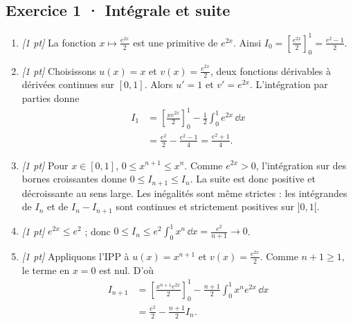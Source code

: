 \subsection*{Exercice 1 · Intégrale et suite}\begin{enumerate}

\item \textit{[1 pt]} La fonction $x\mapsto \frac{e^{2x}}{2}$ est une primitive de $e^{2x}$. Ainsi $I_0=[\frac{e^{2x}}{2}]_0^1=\frac{e^{2}-1}{2}$.

\item \textit{[1 pt]} Choisissons $u(x)=x$ et $v(x)=\frac{e^{2x}}{2}$, deux fonctions dérivables à dérivées continues sur $[0,1]$. Alors $u'=1$ et $v'=e^{2x}$. L'intégration par parties donne
\[\begin{aligned}I_1&=\left[\frac{xe^{2x}}{2}\right]_0^1-\frac{1}{2}\int_0^1e^{2x}\,\dd x\\&=\frac{e^{2}}{2}-\frac{e^{2}-1}{4}=\frac{e^{2}+1}{4}.\end{aligned}\]

\item \textit{[1 pt]} Pour $x\in[0,1]$, $0\le x^{n+1}\le x^n$. Comme $e^{2x}>0$, l'intégration sur des bornes croissantes donne $0\le I_{n+1}\le I_n$. La suite est donc positive et décroissante au sens large. Les inégalités sont même strictes : les intégrandes de $I_n$ et de $I_n-I_{n+1}$ sont continues et strictement positives sur $]0,1[$.

\item \textit{[1 pt]} $e^{2x}\le e^{2}$ ; donc $0\le I_n\le e^{2}\int_0^1x^n\,\dd x=\frac{e^{2}}{n+1}\to0$.

\item \textit{[1 pt]} Appliquons l'IPP à $u(x)=x^{n+1}$ et $v(x)=\frac{e^{2x}}{2}$. Comme $n+1\ge1$, le terme en $x=0$ est nul. D'où
\[\begin{aligned}I_{n+1}&=\left[\frac{x^{n+1}e^{2x}}{2}\right]_0^1-\frac{n+1}{2}\int_0^1x^ne^{2x}\,\dd x\\&=\frac{e^{2}}{2}-\frac{n+1}{2}I_n.\end{aligned}\]

\end{enumerate}

